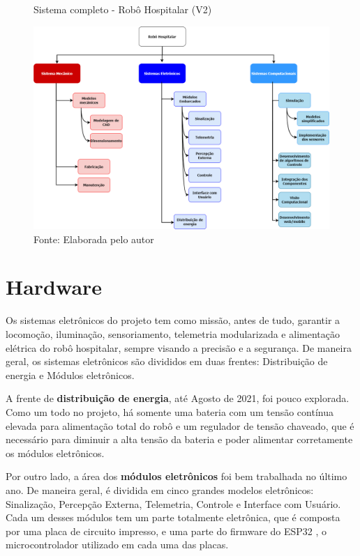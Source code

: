 \documentclass[../poliXuniversity_hospital_(USP)_report.tex]{subfiles}
\begin{document}
\begin{figure}[h]
\centering
    \caption{Sistema completo - Robô Hospitalar (V2)}
    \centering %
    \includegraphics[width=17cm]{sistema_robo.png}
    \caption*{Fonte: Elaborada pelo autor}
    \label{figura:1° Versão Robô Hospitalar}
\end{figure}

\section{Hardware}
Os sistemas eletrônicos do projeto tem como missão, antes de tudo, garantir a locomoção, iluminação, sensoriamento, telemetria modularizada e alimentação elétrica do robô hospitalar, sempre visando a precisão e a segurança. De maneira geral, os sistemas eletrônicos são divididos em duas frentes: Distribuição de energia e Módulos eletrônicos.

A frente de \textbf{distribuição de energia}, até Agosto de 2021, foi pouco explorada. Como um todo no projeto, há somente uma bateria com um tensão contínua elevada para alimentação total do robô e um regulador de tensão chaveado, que é necessário para diminuir a alta tensão da bateria e poder alimentar corretamente os módulos eletrônicos.

Por outro lado, a área dos \textbf{módulos eletrônicos} foi bem trabalhada no último ano. De maneira geral, é dividida em cinco grandes modelos eletrônicos: Sinalização, Percepção Externa, Telemetria, Controle e Interface com Usuário. Cada um desses módulos tem um parte totalmente eletrônica, que é composta por uma placa de circuito impresso, e uma parte do firmware do ESP32 \cite{esp32_datasheet}, o microcontrolador utilizado em cada uma das placas.
\end{document}
